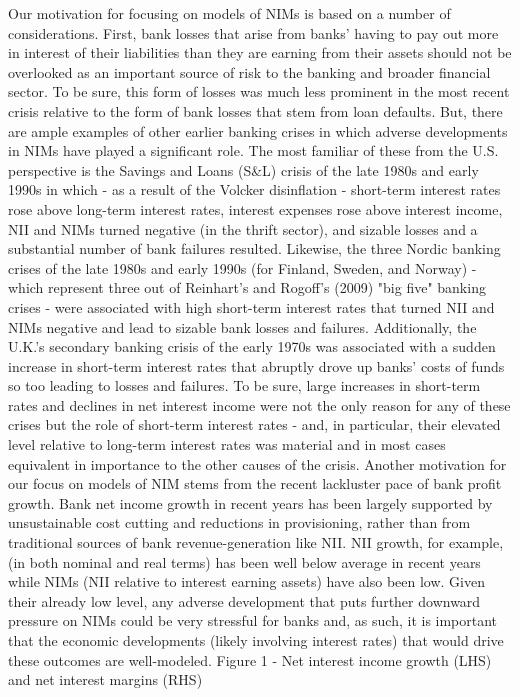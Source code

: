 \documentclass[12pt]{article}
\begin{document}
	Our motivation for focusing on models of NIMs is based on a number of considerations.  First,  bank losses that arise from banks' having to pay out more in interest of their liabilities than they are earning from their assets should not be overlooked as an important source of risk to the banking and broader financial sector.  To be sure, this form of losses was much less prominent in the most recent crisis relative to the form of bank losses that stem from loan defaults.  But, there are ample examples of other earlier banking crises in which adverse developments in NIMs have played a significant role.  The most familiar of these from the U.S. perspective is the Savings and Loans (S\&L) crisis of the late 1980s and early 1990s in which - as a result of the Volcker disinflation - short-term interest rates rose above long-term interest rates, interest expenses rose above interest income, NII and NIMs turned negative (in the thrift sector), and sizable losses and a substantial number of bank failures resulted.  Likewise, the three Nordic banking crises of the late 1980s and early 1990s (for Finland, Sweden, and Norway) - which represent three out of Reinhart's and Rogoff's  (2009) "big five" banking crises - were associated with high short-term interest rates that turned NII and NIMs negative and lead to sizable bank losses and failures.   Additionally, the U.K.'s secondary banking crisis of the early 1970s was associated with a sudden increase in short-term interest rates that abruptly drove up banks' costs of funds so too leading to losses and failures.  To be sure, large increases in short-term rates and declines in net interest income were not the only reason for any of these crises but the role of short-term interest rates - and, in particular, their elevated level relative to long-term interest rates was material and in most cases equivalent in importance to the other causes of the crisis.
	Another motivation for our focus on models of NIM stems from the recent lackluster pace of bank profit growth.   Bank net income growth in recent years has been largely supported by unsustainable cost cutting and reductions in provisioning, rather than from traditional sources of bank revenue-generation like NII.  NII growth, for example, (in both nominal and real terms) has been well below average in recent years while NIMs (NII relative to interest earning assets) have also been low.   Given their already low level, any adverse development that puts further downward pressure on NIMs could be very stressful for banks and, as such, it is important that the economic developments (likely involving interest rates) that would drive these outcomes are well-modeled.
Figure 1 - Net interest income growth (LHS) and net interest margins (RHS)
\end{document}
